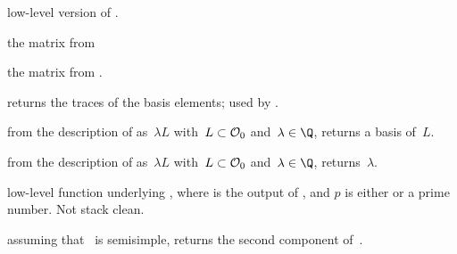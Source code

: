 low-level version of .

the matrix  from 

the matrix  from .

 returns the traces of the
basis elements; used by .

 from the description of 
as~$\lambda L$ with~$L\subset{\cal O}_0$ and~$\lambda\in\Q$, returns a basis
of~$L$.

 from the description of 
as~$\lambda L$ with~$L\subset{\cal O}_0$ and~$\lambda\in\Q$, returns~$\lambda$.


 low-level function underlying
, where  is the output of
, and $p$ is either  or a prime
number. Not stack clean.

 assuming that~ is
semisimple, returns the second component of~.

\newpage
